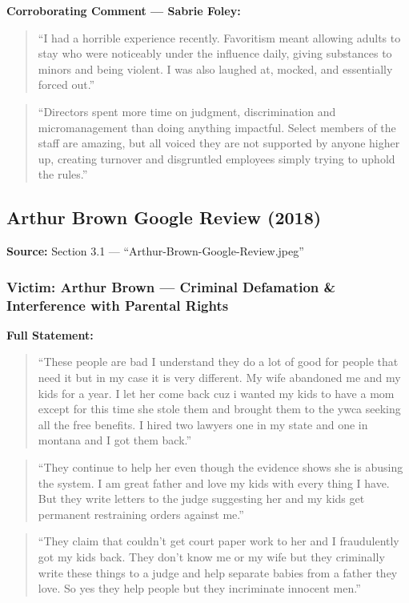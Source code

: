 \documentclass[11pt,letterpaper]{article}
\newenvironment{testimony}{%
    \begin{quote}\itshape\color{DarkGray}%
}{%
    \end{quote}%
}
\begin{document}
\textbf{Corroborating Comment --- Sabrie Foley:}
\begin{testimony}
``I had a horrible experience recently. Favoritism meant allowing adults to stay who were noticeably under the influence daily, giving substances to minors and being violent. I was also laughed at, mocked, and essentially forced out.''
\end{testimony}

\begin{testimony}
``Directors spent more time on judgment, discrimination and micromanagement than doing anything impactful. Select members of the staff are amazing, but all voiced they are not supported by anyone higher up, creating turnover and disgruntled employees simply trying to uphold the rules.''
\end{testimony}

\subsection{Arthur Brown Google Review (2018)}

\textbf{Source:} Section 3.1 --- ``Arthur-Brown-Google-Review.jpeg''

\subsubsection{Victim: Arthur Brown --- Criminal Defamation \& Interference with Parental Rights}

\textbf{Full Statement:}
\begin{testimony}
``These people are bad I understand they do a lot of good for people that need it but in my case it is very different. My wife abandoned me and my kids for a year. I let her come back cuz i wanted my kids to have a mom except for this time she stole them and brought them to the ywca seeking all the free benefits. I hired two lawyers one in my state and one in montana and I got them back.''
\end{testimony}

\begin{testimony}
``They continue to help her even though the evidence shows she is abusing the system. I am great father and love my kids with every thing I have. But they write letters to the judge suggesting her and my kids get permanent restraining orders against me.''
\end{testimony}

\begin{testimony}
``They claim that couldn't get court paper work to her and I fraudulently got my kids back. They don't know me or my wife but they criminally write these things to a judge and help separate babies from a father they love. So yes they help people but they incriminate innocent men.''
\end{testimony}
\end{document}
